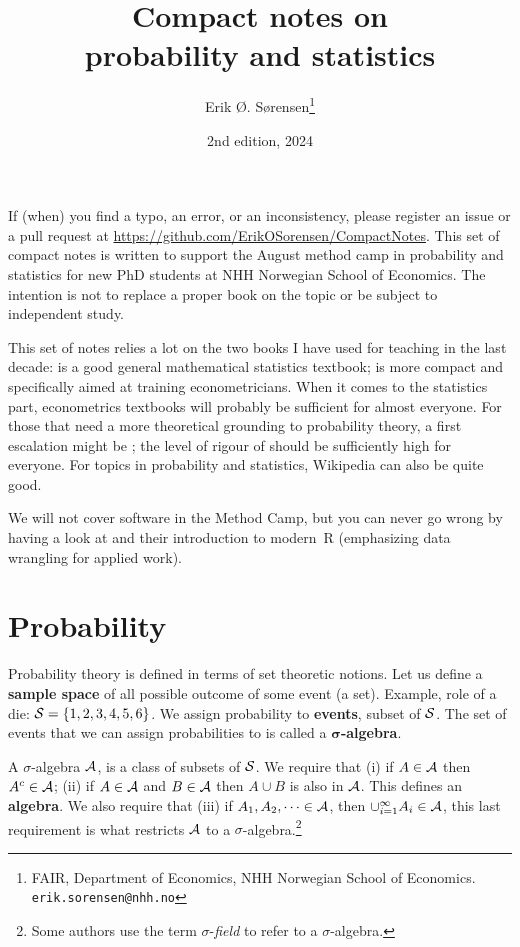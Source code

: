 \documentclass[10pt]{article}
\title{Compact notes on \\ probability and statistics}
\author{Erik Ø. Sørensen\thanks{FAIR, Department of Economics, NHH Norwegian
School of Economics. \texttt{erik.sorensen@nhh.no}}}
\date{2nd edition, 2024}
\begin{document}
\maketitle
\sloppy
\frenchspacing



\tableofcontents

\bigskip\bigskip

\noindent If (when) you find a typo, an error, or an inconsistency,
please register an issue or a pull request at \url{https://github.com/ErikOSorensen/CompactNotes}.
\thispagestyle{empty}
\newpage
\noindent This set of compact notes is written to support the August method camp
in probability and statistics for new PhD students at NHH Norwegian School of
Economics. The intention is not to replace a proper book on the topic or
be subject to independent study. 

This set of notes relies a lot on the two books I have used for teaching in the
last decade: \citet{Hogg2013} is a good  general mathematical statistics
textbook; \citet{Linton2017} is more compact and specifically aimed at training
econometricians. When it comes to the statistics part, econometrics textbooks
will probably be sufficient for almost everyone. For those that need a more
theoretical grounding to probability theory, a first escalation might be
\citet{Rosenthal2006}; the level of rigour of \citet{Billingsley1995} should be
sufficiently high for everyone. For topics in probability and statistics,
Wikipedia can also be quite good.

We will not cover software in the Method Camp, but you can never go wrong by
having a look at \citet{Wickham2017} and their introduction to modern~R (emphasizing
data wrangling for applied work).


\section{Probability}

Probability theory is defined in terms of set theoretic notions. Let us define a
\textbf{sample space} of all possible outcome of some event (a set). Example,
role of a die: $\mathcal{S} =\{1,2,3,4,5,6\}$. We assign probability to
\textbf{events}, subset of $\mathcal{S}$. The set of events that we can assign
probabilities to is called a $\mathbf{\sigma}$\textbf{-algebra}.

A $\sigma$-algebra $\mathcal{A}$, is a class of subsets of $\mathcal{S}$. We
require that (i) if $A\in\mathcal{A}$ then $A^c\in\mathcal{A}$; (ii) if $A\in\mathcal{A}$ and $B\in\mathcal{A}$
then $A\cup B$ is also in $\mathcal{A}$. This defines an \textbf{algebra}. We also
require that (iii) if $A_1,A_2,\dots\in \mathcal{A}$, then $\cup_{i=1}^\infty A_i
\in \mathcal{A}$, this last requirement is what restricts $\mathcal{A}$ to a
$\sigma$-algebra.\footnote{Some authors use the term $\sigma$-\emph{field} to refer to a $\sigma$-algebra.}
\end{document}
